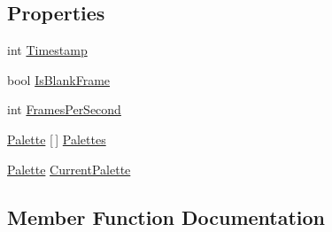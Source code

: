 \subsection*{Properties}
\begin{DoxyCompactItemize}
\item 
int \hyperlink{interface_surge_xamarini_o_s_bindings_1_1_tyco_surge_rtsp_player_ab0103301aa84abf0dc7b577baabd9a8c}{Timestamp}
\item 
bool \hyperlink{interface_surge_xamarini_o_s_bindings_1_1_tyco_surge_rtsp_player_ae6f440f46b6183221699e87e996d0523}{Is\+Blank\+Frame}
\item 
int \hyperlink{interface_surge_xamarini_o_s_bindings_1_1_tyco_surge_rtsp_player_a2f7d8ba1614f5beb70b05b4a31e6bfd8}{Frames\+Per\+Second}
\item 
\hyperlink{interface_surge_xamarini_o_s_bindings_1_1_palette}{Palette} \mbox{[}$\,$\mbox{]} \hyperlink{interface_surge_xamarini_o_s_bindings_1_1_tyco_surge_rtsp_player_ac6b0281c47199d66b2af40bb8cc23486}{Palettes}
\item 
\hyperlink{interface_surge_xamarini_o_s_bindings_1_1_palette}{Palette} \hyperlink{interface_surge_xamarini_o_s_bindings_1_1_tyco_surge_rtsp_player_a2188806c1edbb64bc94f2003a7c5f70e}{Current\+Palette}
\end{DoxyCompactItemize}


\subsection{Member Function Documentation}
\mbox{\label{interface_surge_xamarini_o_s_bindings_1_1_tyco_surge_rtsp_player_a083dfdebfaa86d4ee08524a8c563d9c0}} 
